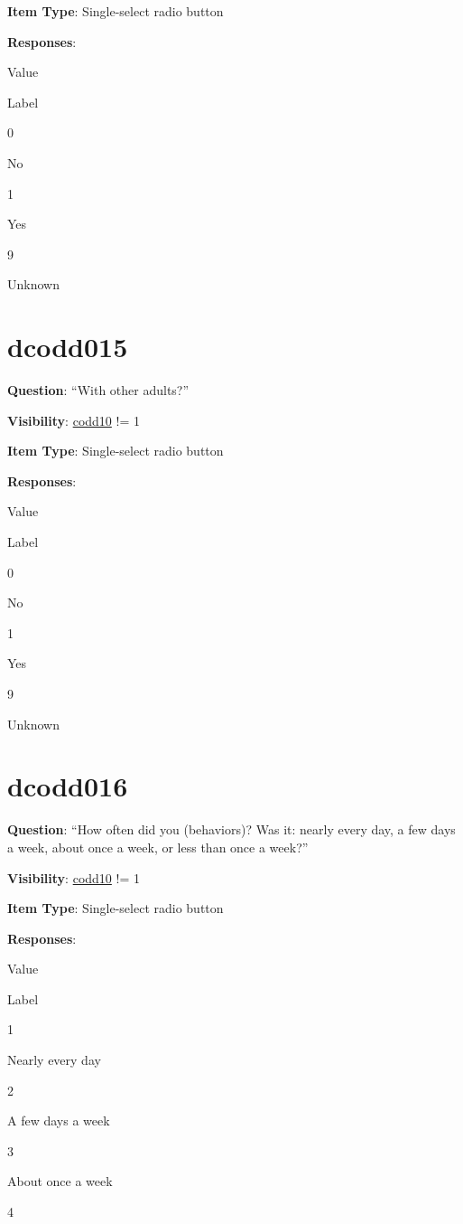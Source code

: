 \documentclass[]{book}
\begin{document}
\textbf{Item Type}: Single-select radio button

\textbf{Responses}:

Value

Label

0

No

1

Yes

9

Unknown

\hypertarget{dcodd015}{%
\section{dcodd015}\label{dcodd015}}

\textbf{Question}: ``With other adults?''

\textbf{Visibility}: \protect\hyperlink{codd10}{codd10} != 1

\textbf{Item Type}: Single-select radio button

\textbf{Responses}:

Value

Label

0

No

1

Yes

9

Unknown

\hypertarget{dcodd016}{%
\section{dcodd016}\label{dcodd016}}

\textbf{Question}: ``How often did you (behaviors)? Was it: nearly every day, a few days a week, about once a week, or less than once a week?''

\textbf{Visibility}: \protect\hyperlink{codd10}{codd10} != 1

\textbf{Item Type}: Single-select radio button

\textbf{Responses}:

Value

Label

1

Nearly every day

2

A few days a week

3

About once a week

4
\end{document}
